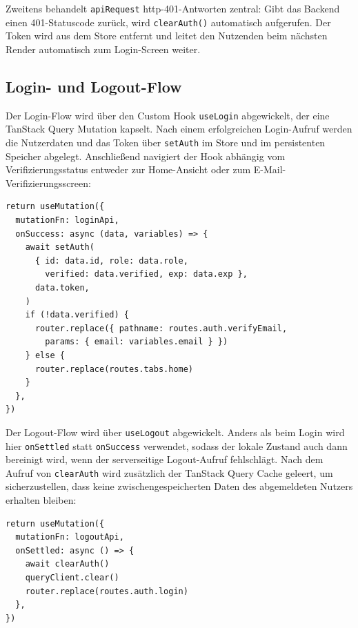 Zweitens behandelt \texttt{apiRequest} \gls{http}-401-Antworten zentral: Gibt das Backend einen 401-Statuscode zurück, wird \texttt{clearAuth()} automatisch aufgerufen. Der Token wird aus dem Store entfernt und leitet den Nutzenden beim nächsten Render automatisch zum Login-Screen weiter.

\subsection{Login- und Logout-Flow}

Der Login-Flow wird über den Custom Hook \texttt{useLogin} abgewickelt, der eine TanStack
Query Mutation kapselt. Nach einem erfolgreichen Login-Aufruf werden die Nutzerdaten und
das Token über \texttt{setAuth} im Store und im persistenten Speicher abgelegt. Anschließend
navigiert der Hook abhängig vom Verifizierungsstatus entweder zur Home-Ansicht oder zum
E-Mail-Verifizierungsscreen:

\begin{listing}[H]
\begin{verbatim}
return useMutation({
  mutationFn: loginApi,
  onSuccess: async (data, variables) => {
    await setAuth(
      { id: data.id, role: data.role,
        verified: data.verified, exp: data.exp },
      data.token,
    )
    if (!data.verified) {
      router.replace({ pathname: routes.auth.verifyEmail,
        params: { email: variables.email } })
    } else {
      router.replace(routes.tabs.home)
    }
  },
})
\end{verbatim}
\caption{Login-Flow in useLogin.ts}
\label{lst:use-login}
\end{listing}

Der Logout-Flow wird über \texttt{useLogout} abgewickelt. Anders als beim Login wird hier
\texttt{onSettled} statt \texttt{onSuccess} verwendet, sodass der lokale Zustand auch dann
bereinigt wird, wenn der serverseitige Logout-Aufruf fehlschlägt. Nach dem Aufruf von
\texttt{clearAuth} wird zusätzlich der TanStack Query Cache geleert, um sicherzustellen,
dass keine zwischengespeicherten Daten des abgemeldeten Nutzers erhalten bleiben:

\begin{listing}[H]
\begin{verbatim}
return useMutation({
  mutationFn: logoutApi,
  onSettled: async () => {
    await clearAuth()
    queryClient.clear()
    router.replace(routes.auth.login)
  },
})
\end{verbatim}
\caption{Logout-Flow in useLogout.ts}
\label{lst:use-logout}
\end{listing}

